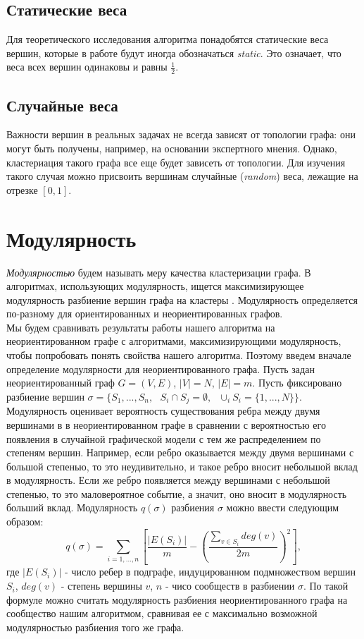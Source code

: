 	\subsection{Статические веса}
	Для теоретического исследования алгоритма понадобятся статические веса вершин, которые в работе будут иногда обозначаться \textit{static}. Это означает, что веса всех вершин одинаковы и равны $\frac{1}{2}$.
	
	\subsection{Случайные веса}
	Важности вершин в реальных задачах не всегда зависят от топологии графа: они могут быть получены, например, на основании экспертного мнения. Однако, кластериация такого графа все еще будет зависеть от топологии. Для изучения такого случая можно присвоить вершинам случайные (\textit{random}) веса, лежащие на отрезке $[0,1]$.

\section{Модулярность}
\textit{Модулярностью} будем называть меру качества кластеризации графа. В алгоритмах, использующих модулярность, ищется максимизирующее модулярность разбиение вершин графа на кластеры \cite{modularity}. Модулярность определяется по-разному для ориентированных и неориентированных графов.\\

Мы будем сравнивать результаты работы нашего алгоритма на неориентированном графе с алгоритмами, максимизирующими модулярность, чтобы попробовать понять свойства нашего алгоритма. Поэтому введем вначале определение модулярности для неориентированного графа. Пусть задан неориентированный граф $G=(V,E)$, $|V|=N$, $|E|=m$. Пусть фиксировано разбиение вершин $\sigma=\{S_1,...,S_n,\textbf{ }S_i\cap S_j=\emptyset,\textbf{ }\cup_i S_i=\{1,...,N\}\}$. Модулярность оценивает вероятность существования ребра между двумя вершинами в в неориентированном графе в сравнении с вероятностью его появления в случайной графической модели с тем же распределением по степеням вершин. Например, если ребро оказывается между двумя вершинами с большой степенью, то это неудивительно, и такое ребро вносит небольшой вклад в модулярность. Если же ребро появляется между вершинами с небольшой степенью, то это маловероятное событие, а значит, оно вносит в модулярность больший вклад. Модулярность $q(\sigma)$ разбиения $\sigma$ можно ввести следующим образом:
\begin{equation}
q(\sigma)=\sum_{i=1,\dots,n} [\frac{|E(S_i)|}{m}-(\frac{\sum_{v\in S_i} deg(v)}{2m})^2],
\end{equation}
где $|E(S_i)|$ - число ребер в подграфе, индуцированном подмножеством вершин $S_i$, $deg(v)$ - степень вершины $v$, $n$ - чисо сообществ в разбиении $\sigma$. По такой формуле можно считать модулярность разбиения неориентированного графа на сообщество нашим алгоритмом, сравнивая ее с максимально возможной модулярностью разбиения того же графа.\\

